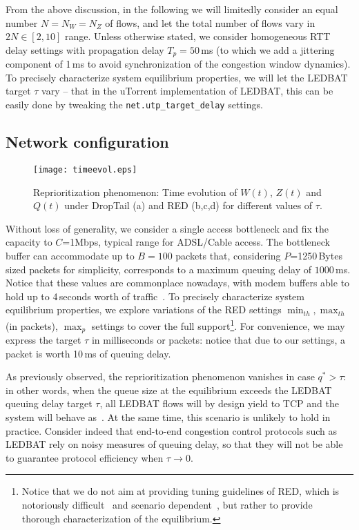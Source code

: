 \documentclass[conference]{IEEEtran}
\newcommand{\figLC}[2]{
		\caption{#2}
		\label{fig:#1}
}
\begin{document}
From the above discussion, in the following we will limitedly consider an equal number $N=N_W=N_Z$ of flows, and let the total number of flows vary in  $2N\in[2,10]$ range. Unless otherwise stated, we consider homogeneous RTT delay settings with propagation delay $T_p=50$\,ms (to which we add a jittering component of 1\,ms to avoid synchronization of the congestion window dynamics).
To precisely characterize system equilibrium properties, we will let 
the LEDBAT target $\tau$ vary -- that in the uTorrent implementation of LEDBAT, this can be easily done by tweaking the {\texttt{net.utp\_target\_delay}} settings.

\subsection{Network configuration}


\begin{figure*}[t]
    \begin{center}
        \texttt{[image: timeevol.eps]}
        \figLC{time}{Reprioritization phenomenon: Time evolution of $W(t)$, $Z(t)$ and $Q(t)$ under DropTail (a) and RED (b,c,d) for different values of $\tau$. }
    \end{center}
\end{figure*}


Without loss of generality, we consider a single access bottleneck and fix the capacity to $C$=1Mbps, typical range for ADSL/Cable access. The bottleneck buffer can accommodate up to $B=100$ packets that, considering $P$=1250\,Bytes sized packets for simplicity, corresponds to a maximum queuing delay of $1000$\,ms. Notice that these values are commonplace nowadays, with modem buffers able to hold up to 4\,seconds worth of traffic~\cite{kreibich2010netalyzr}. 
To precisely characterize system equilibrium properties, we explore variations of the RED settings $\min_{th}, \max_{th}$ (in packets), $\max_p$ settings to cover the full support\footnote{Notice that we do not aim at providing tuning guidelines of RED, which is notoriously difficult~\cite{red_tuning} and scenario dependent~\cite{hollot01infocom}, but rather to provide thorough characterization of the equilibrium.}. For convenience, we may express the target $\tau$ in milliseconds or packets: notice that due to our settings, a packet is worth 10\,ms of queuing delay.


As previously observed, the reprioritization phenomenon vanishes in case $q^* >  \tau$: in other words, when the queue size at the equilibrium exceeds the LEDBAT queuing delay target $\tau$, all LEDBAT flows will by design yield to TCP and the system will behave as~\cite{misra00sigcomm,hollot01infocom}. At the same time, this scenario is unlikely to hold in practice. Consider indeed that end-to-end congestion control protocols such as LEDBAT rely on noisy measures of queuing delay, so that they will not be able to guarantee protocol efficiency when $\tau \rightarrow 0$.
 
\end{document}
